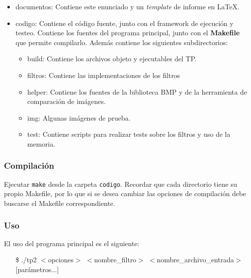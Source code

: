 \documentclass[a4paper, 12pt]{article}
\newcommand{\code}[1]{{\sffamily #1}\xspace}
\begin{document}
\begin{itemize}
    \itemsep0em
    \item
        \code{documentos}: Contiene este enunciado y un \emph{template}
        de informe en \LaTeX.

	\item
		\code{codigo}: Contiene el código fuente, junto con el framework
		de ejecución y testeo.
		Contiene los fuentes del programa principal,
    		junto con el \textbf{Makefile} que permite compilarlo.
		Además contiene los siguientes subdirectorios:
		\begin{itemize}
		\item
			\code{build}: Contiene los archivos objeto y ejecutables
			del TP.

		\item
			\code{filtros}: Contiene las implementaciones de los filtros

		\item
			\code{helper}: Contiene los fuentes de la biblioteca BMP y
			de la herramienta de comparación de imágenes.

		\item
			\code{img}: Algunas imágenes de prueba.

    		\item
			\code{test}: Contiene scripts para realizar tests sobre los
	        filtros y uso de la memoria.
	\end{itemize}
\end{itemize}

\subsubsection*{Compilación}

Ejecutar \texttt{make} desde la carpeta \texttt{codigo}.
Recordar que cada directorio tiene su propio \code{Makefile},
por lo que si se desea cambiar las opciones de compilación
debe buscarse el \code{Makefile} correspondiente.

\subsubsection*{Uso}

\vspace*{0.2cm}
\noindent El uso del programa principal es el siguiente:
\vspace*{-0.2cm}
\begin{itemize}
    \item [\code{\$}]
        \code{./tp2 $<$opciones$>$ $<$nombre\_filtro$>$
              $<$nombre\_archivo\_entrada$>$ [parámetros...]}
\end{itemize}
\end{document}

